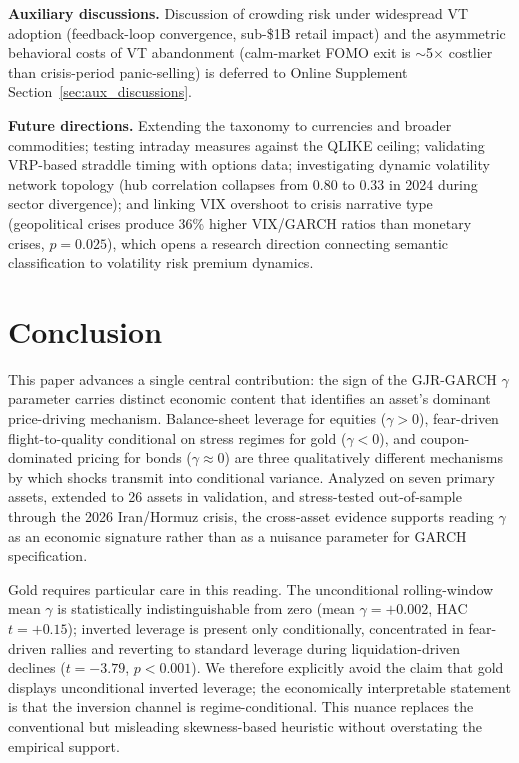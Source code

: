 \textbf{Auxiliary discussions.} Discussion of crowding risk under widespread VT adoption (feedback-loop convergence, sub-\$1B retail impact) and the asymmetric behavioral costs of VT abandonment (calm-market FOMO exit is $\sim$5$\times$ costlier than crisis-period panic-selling) is deferred to Online Supplement Section~\ref{sec:aux_discussions}.

\textbf{Future directions.} Extending the taxonomy to currencies and broader commodities; testing intraday measures against the QLIKE ceiling; validating VRP-based straddle timing with options data; investigating dynamic volatility network topology (hub correlation collapses from 0.80 to 0.33 in 2024 during sector divergence); and linking VIX overshoot to crisis narrative type (geopolitical crises produce 36\% higher VIX/GARCH ratios than monetary crises, $p = 0.025$), which opens a research direction connecting semantic classification to volatility risk premium dynamics.



\section{Conclusion}\label{sec:conclusion}

This paper advances a single central contribution: the sign of the GJR-GARCH $\gamma$ parameter carries distinct economic content that identifies an asset's dominant price-driving mechanism. Balance-sheet leverage for equities ($\gamma > 0$), fear-driven flight-to-quality conditional on stress regimes for gold ($\gamma < 0$), and coupon-dominated pricing for bonds ($\gamma \approx 0$) are three qualitatively different mechanisms by which shocks transmit into conditional variance. Analyzed on seven primary assets, extended to 26 assets in validation, and stress-tested out-of-sample through the 2026 Iran/Hormuz crisis, the cross-asset evidence supports reading $\gamma$ as an economic signature rather than as a nuisance parameter for GARCH specification.

Gold requires particular care in this reading. The unconditional rolling-window mean $\gamma$ is statistically indistinguishable from zero (mean $\gamma = +0.002$, HAC $t = +0.15$); inverted leverage is present only conditionally, concentrated in fear-driven rallies and reverting to standard leverage during liquidation-driven declines ($t = -3.79$, $p < 0.001$). We therefore explicitly avoid the claim that gold displays unconditional inverted leverage; the economically interpretable statement is that the inversion channel is regime-conditional. This nuance replaces the conventional but misleading skewness-based heuristic without overstating the empirical support.

